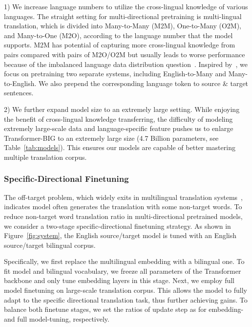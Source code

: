 \documentclass[11pt,a4paper]{article}
\newcommand{\zct}{\color{black}}
\begin{document}
1) We increase language numbers to utilize the cross-lingual knowledge of various languages. 
The straight setting for multi-directional pretraining is multi-lingual translation, which is divided into Many-to-Many (M2M), One-to-Many (O2M), and Many-to-One (M2O), according to the language number that the model supports. M2M has potential of capturing more cross-lingual knowledge from  pairs compared with  pairs of M2O/O2M but usually leads to worse performance because of the imbalanced language data distribution question~\cite{freitag2020complete}.
Inspired by~\cite{facebook2021}, we focus on pretraining two separate systems, including English-to-Many and Many-to-English. We also prepend the corresponding language token to source \& target sentences.

2) We further expand model size to an extremely large setting. While enjoying the benefit of cross-lingual knowledge transferring, the difficulty of modeling extremely large-scale data and language-specific feature pushes us to enlarge Transformer-\textsc{BIG} to an extremely large size {\zct (4.7 Billion parameters, see Table~\ref{tab:models})}. 
This ensures our models are capable of better mastering multiple translation corpus.

\subsubsection{Specific-Directional Finetuning}
\label{ssec:sd-ft}
{\zct The off-target problem, which widely exits in multilingual translation systems~\cite{yang-etal-2021-improving-multilingual}, indicates model often generates the translation with some non-target words.}
To reduce non-target word translation ratio in multi-directional pretrained models, we consider a two-stage specific-directional finetuning strategy. As shown in Figure~\ref{fig:system}, the English source/target model is tuned with an English source/target bilingual corpus.

Specifically, we first replace the multilingual embedding with a bilingual one. To fit model and bilingual vocabulary, we freeze all parameters of the Transformer backbone and only tune embedding layers in this stage. Next, we employ full model finetuning on large-scale translation corpus. This allows {\zct the} model to fully adapt to the specific directional translation task, thus further achieving gains. To balance both finetune stages, we set the ratios of update step as  for embedding- and full model-tuning, respectively.
\end{document}
